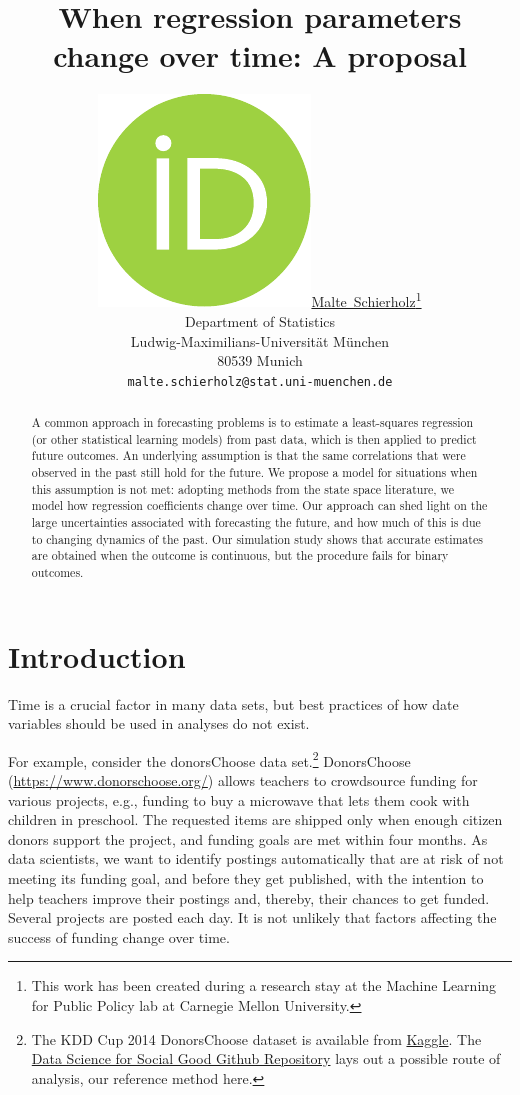\documentclass{article}
\title{When regression parameters change over time: A proposal}
\author{ \href{https://orcid.org/0000-0003-4058-1543}{\includegraphics[scale=0.06]{orcid.pdf}\hspace{1mm}Malte~Schierholz}\thanks{This work has been created during a research stay at the Machine Learning for Public Policy lab at Carnegie Mellon University.} \\
	Department of Statistics\\
	Ludwig-Maximilians-Universität München\\
	80539 Munich \\
	\texttt{malte.schierholz@stat.uni-muenchen.de} \\
}
\begin{document}
\maketitle

\begin{abstract}
	A common approach in forecasting problems is to estimate a least-squares regression (or other statistical learning models) from past data, which is then applied to predict future outcomes. An underlying assumption is that the same correlations that were observed in the past still hold for the future. We propose a model for situations when this assumption is not met: adopting methods from the state space literature, we model how regression coefficients change over time. Our approach can shed light on the large uncertainties associated with forecasting the future, and how much of this is due to changing dynamics of the past. Our simulation study shows that accurate estimates are obtained when the outcome is continuous, but the procedure fails for binary outcomes.
\end{abstract}




\section{Introduction}\label{sec:introduction}

Time is a crucial factor in many data sets, but best practices of how date variables should be used in analyses do not exist.

For example, consider the donorsChoose data set.\footnote{The KDD Cup 2014 DonorsChoose dataset is available from \href{https://www.kaggle.com/c/kdd-cup-2014-predicting-excitement-at-donors-choose/data}{Kaggle}. The \href{https://github.com/dssg/donors-choose}{Data Science for Social Good Github Repository} lays out a possible route of analysis, our reference method here.} DonorsChoose (\url{https://www.donorschoose.org/}) allows teachers to crowdsource funding for various projects, e.g., funding to buy a microwave that lets them cook with children in preschool. The requested items are shipped only when enough citizen donors support the project, and funding goals are met within four months. As data scientists, we want to identify postings automatically that are at risk of not meeting its funding goal, and before they get published, with the intention to help teachers improve their postings and, thereby, their chances to get funded. Several projects are posted each day. It is not unlikely that factors affecting the success of funding change over time.
\end{document}
